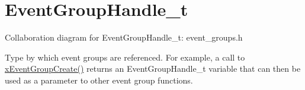 \hypertarget{group___event_group_handle__t}{}\section{Event\+Group\+Handle\+\_\+t}
\label{group___event_group_handle__t}
Collaboration diagram for Event\+Group\+Handle\+\_\+t\+:
event\+\_\+groups.\+h

Type by which event groups are referenced. For example, a call to \hyperlink{vendor_2ceedling_2plugins_2freertos_2src_2freertos_2include_2event__groups_8h_a7ed741a0902718aca9c8d3ca273f1b73}{x\+Event\+Group\+Create()} returns an Event\+Group\+Handle\+\_\+t variable that can then be used as a parameter to other event group functions. 